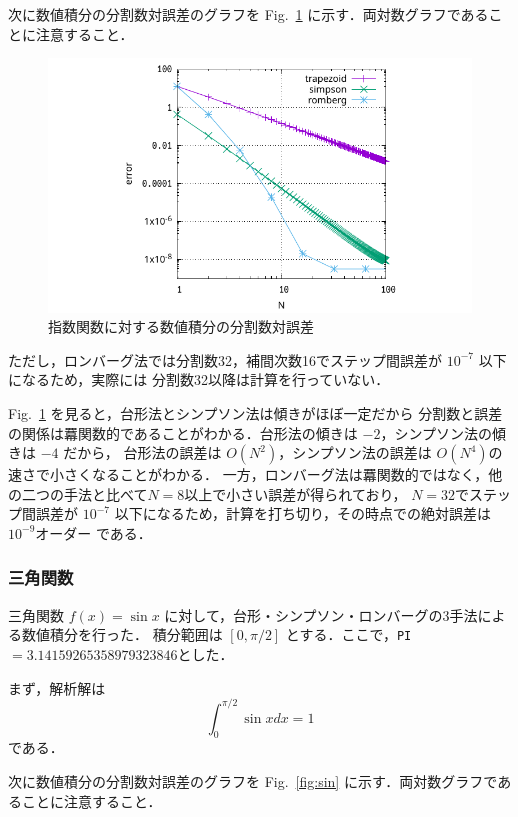 \documentclass[gutter=20mm,fore-edge=20mm,head_space=30mm,foot_space=30mm]{jlreq}
\begin{document}
次に数値積分の分割数対誤差のグラフを Fig.~\ref{fig:exp} に示す．両対数グラフであることに注意すること．

\begin{figure}[H]
  \centering
  \includegraphics[width=0.8\linewidth]{3/exp/exp.pdf}
  \caption{指数関数に対する数値積分の分割数対誤差}
  \label{fig:exp}
\end{figure}

ただし，ロンバーグ法では分割数32，補間次数16でステップ間誤差が $10^{-7}$ 以下になるため，実際には
分割数32以降は計算を行っていない．

Fig.~\ref{fig:exp} を見ると，台形法とシンプソン法は傾きがほぼ一定だから
分割数と誤差の関係は羃関数的であることがわかる．台形法の傾きは $-2$，シンプソン法の傾きは $-4$ だから，
台形法の誤差は $O(N^2)$，シンプソン法の誤差は $O(N^4)$の速さで小さくなることがわかる．
一方，ロンバーグ法は羃関数的ではなく，他の二つの手法と比べて$N=8$以上で小さい誤差が得られており，
$N=32$でステップ間誤差が $10^{-7}$ 以下になるため，計算を打ち切り，その時点での絶対誤差は$10^{-9}$オーダー
である．

\subsubsection{三角関数}
三角関数 $f(x) = \sin x$ に対して，台形・シンプソン・ロンバーグの3手法による数値積分を行った．
積分範囲は $[0, \pi/2]$ とする．ここで，\verb|PI|$=3.14159265358979323846$とした．

まず，解析解は
\begin{equation}
  \int_0^{\pi/2} \sin x dx = 1
\end{equation}
である．

次に数値積分の分割数対誤差のグラフを Fig.~\ref{fig:sin} に示す．両対数グラフであることに注意すること．
\end{document}
